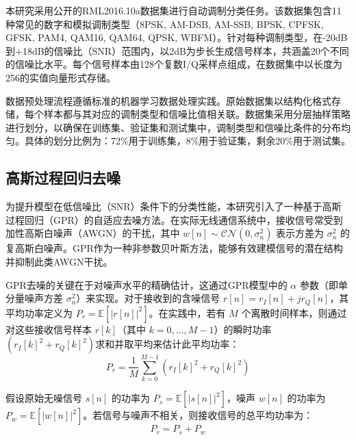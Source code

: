 \documentclass[conference]{IEEEtran}
\begin{document}
本研究采用公开的RML2016.10a数据集进行自动调制分类任务。该数据集包含11种常见的数字和模拟调制类型（8PSK, AM-DSB, AM-SSB, BPSK, CPFSK, GFSK, PAM4, QAM16, QAM64, QPSK, WBFM）。针对每种调制类型，在-20dB到+18dB的信噪比（SNR）范围内，以2dB为步长生成信号样本，共涵盖20个不同的信噪比水平。每个信号样本由128个复数I/Q采样点组成，在数据集中以长度为256的实值向量形式存储。

数据预处理流程遵循标准的机器学习数据处理实践。原始数据集以结构化格式存储，每个样本都与其对应的调制类型和信噪比值相关联。数据集采用分层抽样策略进行划分，以确保在训练集、验证集和测试集中，调制类型和信噪比条件的分布均匀。具体的划分比例为：72\%用于训练集，8\%用于验证集，剩余20\%用于测试集。


\subsection{高斯过程回归去噪}

为提升模型在低信噪比（SNR）条件下的分类性能，本研究引入了一种基于高斯过程回归（GPR）的自适应去噪方法。在实际无线通信系统中，接收信号常受到加性高斯白噪声（AWGN）的干扰，其中 $w[n] \sim \mathcal{CN}(0, \sigma_n^2)$ 表示方差为 $\sigma_n^2$ 的复高斯白噪声。GPR作为一种非参数贝叶斯方法，能够有效建模信号的潜在结构并抑制此类AWGN干扰。

GPR去噪的关键在于对噪声水平的精确估计，这通过GPR模型中的 $\alpha$ 参数（即单分量噪声方差 $\sigma_n^2$）来实现。对于接收到的含噪信号 $r[n]=r_I[n]+jr_Q[n]$，其平均功率定义为 $P_r = \mathbb{E}[|r[n]|^2]$。在实践中，若有 $M$ 个离散时间样本，则通过对这些接收信号样本 $r[k]$（其中 $k=0, \ldots, M-1$）的瞬时功率 $(r_I[k]^2 + r_Q[k]^2)$求和并取平均来估计此平均功率：
\begin{equation}
P_r = \frac{1}{M}\sum_{k=0}^{M-1}(r_I[k]^2+r_Q[k]^2)
\end{equation}

假设原始无噪信号 $s[n]$ 的功率为 $P_s = \mathbb{E}[|s[n]|^2]$，噪声 $w[n]$ 的功率为 $P_w = \mathbb{E}[|w[n]|^2]$。若信号与噪声不相关，则接收信号的总平均功率为：
\begin{equation}
P_r = P_s + P_w
\end{equation}
\end{document}
